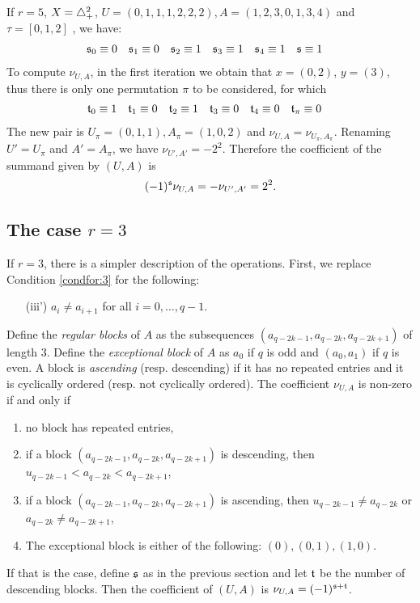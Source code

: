 \begin{example}
	If $r=5$, $X= \triangle_{+}^2$, $U = (0,1,1,1,2,2,2), A = (1,2,3,0,1,3,4)$ and $\tau = [0,1,2]$ , we have:
	\begin{align*}
 \mathfrak{s}_0 &\equiv 0
		&
		\mathfrak{s}_1 &\equiv 0
		&
		\mathfrak{s}_2 &\equiv 1
		&
		\mathfrak{s}_3 &\equiv 1
		&
		\mathfrak{s}_4 &\equiv 1
		&
		\mathfrak{s} &\equiv 1
	\end{align*}
	To compute $\nu_{U,A}$, in the first iteration we obtain that $x=(0,2)$, $y=(3)$, thus there is only one permutation $\pi$ to be considered, for which
	\begin{align*}
		\mathfrak{t}_0 &\equiv 1
		&
		\mathfrak{t}_1 &\equiv 0
		&
		\mathfrak{t}_2 &\equiv 1
		&
		\mathfrak{t}_3 &\equiv 0
		&
		\mathfrak{t}_4 &\equiv 0
		&
		\mathfrak{t}_{\pi} &\equiv 0
	\end{align*}
	The new pair is $U_{\pi} = (0,1,1), A_\pi = (1,0,2)$ and $\nu_{U,A} = \nu_{U_\pi,A_\pi}$. Renaming $U' = U_\pi$ and $A' = A_\pi$, we have $\nu_{U',A'} = -2^2$. Therefore the coefficient of the summand given by $(U,A)$ is
	\[
		(-1)^{\mathfrak{s}} \nu_{U,A} = -\nu_{U',A'} = 2^2.
	\]
\end{example}

\subsection{The case \texorpdfstring{$r=3$}{r = 3}} If $r=3$, there is a simpler description of the operations. First, we replace Condition \eqref{condfor:3} for the following:
\begin{itemize}
	\item[(iii')] $a_i\neq a_{i+1}$ for all $i=0,\dots,q-1$.
\end{itemize}
Define the \emph{regular blocks} of $A$ as the subsequences $(a_{q-2k-1},a_{q-2k},a_{q-2k+1})$ of length $3$. Define the \emph{exceptional block} of $A$ as $a_0$ if $q$ is odd and $(a_0,a_1)$ if $q$ is even. A block is \emph{ascending} (resp. descending) if it has no repeated entries and it is cyclically ordered (resp. not cyclically ordered). The coefficient $\nu_{U,A}$ is non-zero if and only if
\begin{enumerate}
	\item no block has repeated entries,
	\item if a block $(a_{q-2k-1},a_{q-2k},a_{q-2k+1})$ is descending, then $u_{q-2k-1}<a_{q-2k}<a_{q-2k+1}$,
	\item if a block $(a_{q-2k-1},a_{q-2k},a_{q-2k+1})$ is ascending, then $u_{q-2k-1}\neq a_{q-2k}$ or $a_{q-2k}\neq a_{q-2k+1}$,
	\item The exceptional block is either of the following: $(0),(0,1),(1,0)$.
\end{enumerate}
If that is the case, define $\mathfrak{s}$ as in the previous section and let $\mathfrak{t}$ be the number of descending blocks. Then the coefficient of $(U,A)$ is $\nu_{U,A} = (-1)^{\mathfrak{s}+\mathfrak{t}}$.

